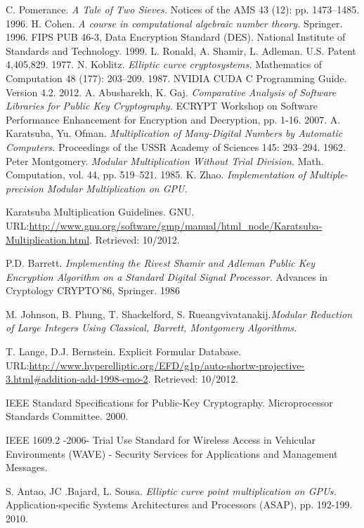 \documentclass[11pt,twocolumn]{IEEEtran}
\begin{document}
\begin{thebibliography}{9}
C. Pomerance. \emph{A Tale of Two Sieves.} Notices of the AMS 43 (12): pp. 1473–1485. 1996.
H. Cohen. \emph{A course in computational algebraic number theory.} Springer. 1996.
FIPS PUB 46-3, Data Encryption Standard (DES).
National Institute of Standards and Technology. 1999.
L. Ronald, A. Shamir, L. Adleman.  U.S. Patent 4,405,829. 1977.
N. Koblitz. \emph{Elliptic curve cryptosystems.} Mathematics of Computation 48 (177): 203–209. 1987.
NVIDIA CUDA C Programming Guide. Version 4.2. 2012.
A. Abusharekh, K. Gaj. \emph{Comparative Analysis of Software Libraries
for Public Key Cryptography. }ECRYPT Workshop on Software
Performance Enhancement for Encryption and Decryption, pp. 1-16.
2007.
A. Karatsuba, Yu. Ofman. \emph{Multiplication of Many-Digital Numbers by Automatic Computers.} Proceedings of the USSR Academy of Sciences 145: 293–294. 1962.
Peter Montgomery. \emph{Modular Multiplication Without Trial Division.} Math. Computation, vol. 44, pp. 519–521. 1985.
K. Zhao.\emph{ Implementation of Multiple-precision Modular Multiplication on GPU.}

Karatsuba Multiplication Guidelines. GNU. URL:\url{http://www.gnu.org/software/gmp/manual/html_node/Karatsuba-Multiplication.html}.
Retrieved: 10/2012.

P.D. Barrett. \emph{Implementing the Rivest Shamir and Adleman Public Key Encryption Algorithm on a Standard Digital Signal Processor.} Advances in Cryptology CRYPTO'86, Springer. 1986

M. Johnson, B. Phung, T. Shackelford, S. Rueangvivatanakij.\emph{Modular Reduction of Large Integers Using Classical, Barrett, Montgomery Algorithms. }

T. Lange, D.J. Bernstein. Explicit Formular Database. URL:\url{http://www.hyperelliptic.org/EFD/g1p/auto-shortw-projective-3.html#addition-add-1998-cmo-2}. Retrieved: 10/2012.

IEEE Standard Specifications for Public-Key Cryptography. Microprocessor Standards Committee. 2000.

IEEE 1609.2 -2006- Trial Use Standard for Wireless Access in Vehicular Environments (WAVE) - Security Services for Applications and Management Messages.

S. Antao, JC .Bajard, L. Sousa. \emph{ Elliptic curve point multiplication on GPUs. }
Application-specific Systems Architectures and Processors (ASAP), pp. 192-199. 2010.


\end{thebibliography}
\end{document}
